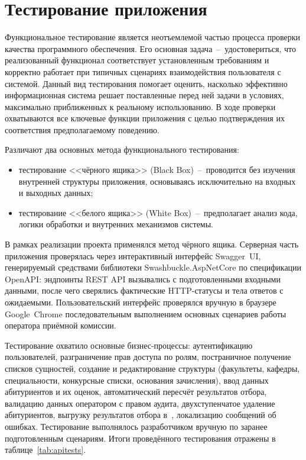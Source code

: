 \section{Тестирование приложения}

Функциональное тестирование является неотъемлемой частью процесса проверки качества программного обеспечения.
Его основная задача~--~удостовериться, что реализованный функционал соответствует установленным требованиям и корректно работает при типичных сценариях взаимодействия пользователя с системой.
Данный вид тестирования помогает оценить, насколько эффективно информационная система решает поставленные перед ней задачи в условиях, максимально приближенных к реальному использованию.
В ходе проверки охватываются все ключевые функции приложения с целью подтверждения их соответствия предполагаемому поведению.

Различают два основных метода функционального тестирования:
\begin{itemize}
    \item тестирование <<чёрного ящика>> (Black Box)~--~проводится без изучения внутренней структуры приложения, основываясь исключительно на входных и выходных данных;
    \item тестирование <<белого ящика>> (White Box)~--~предполагает анализ кода, логики обработки и внутренних механизмов системы.
\end{itemize}

В рамках реализации проекта применялся метод чёрного ящика.
Серверная часть приложения проверялась через интерактивный интерфейс Swagger~UI, генерируемый средствами библиотеки Swashbuckle.AspNetCore по спецификации OpenAPI: эндпоинты REST API вызывались с подготовленными входными данными, после чего сверялись фактические HTTP-статусы и тела ответов с ожидаемыми.
Пользовательский интерфейс проверялся вручную в браузере Google~Chrome последовательным выполнением основных сценариев работы оператора приёмной комиссии.

Тестирование охватило основные бизнес-процессы: аутентификацию пользователей, разграничение прав доступа по ролям, постраничное получение списков сущностей, создание и редактирование структуры (факультеты, кафедры, специальности, конкурсные списки, основания зачисления), ввод данных абитуриентов и их оценок, автоматический пересчёт результатов отбора, валидацию данных оператором с правом аудита, двухступенчатое удаление абитуриентов, выгрузку результатов отбора в~, локализацию сообщений об ошибках.
Тестирование выполнялось разработчиком вручную по заранее подготовленным сценариям.
Итоги проведённого тестирования отражены в таблице~\ref{tab:apitests}.


